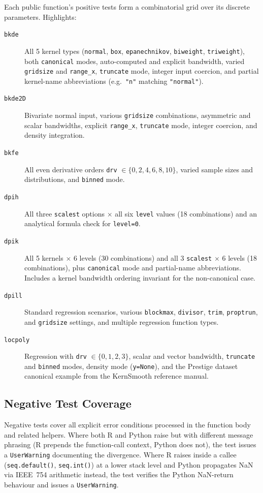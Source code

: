 \documentclass[12pt,a4paper]{article}
\begin{document}
Each public function's positive tests form a combinatorial grid over its discrete parameters. Highlights:
\begin{description}
\item[\texttt{bkde}] All 5 kernel types (\texttt{normal}, \texttt{box}, \texttt{epanechnikov}, \texttt{biweight}, \texttt{triweight}), both \texttt{canonical} modes, auto-computed and explicit bandwidth, varied \texttt{gridsize} and \texttt{range\_x}, \texttt{truncate} mode, integer input coercion, and partial kernel-name abbreviations (e.g.\ \texttt{"n"} matching \texttt{"normal"}).
\item[\texttt{bkde2D}] Bivariate normal input, various \texttt{gridsize} combinations, asymmetric and scalar bandwidths, explicit \texttt{range\_x}, \texttt{truncate} mode, integer coercion, and density integration.
\item[\texttt{bkfe}] All even derivative orders \texttt{drv} $\in \{0, 2, 4, 6, 8, 10\}$, varied sample sizes and distributions, and \texttt{binned} mode.
\item[\texttt{dpih}] All three \texttt{scalest} options $\times$ all six \texttt{level} values (18 combinations) and an analytical formula check for \texttt{level=0}.
\item[\texttt{dpik}] All 5 kernels $\times$ 6 levels (30 combinations) and all 3 \texttt{scalest} $\times$ 6 levels (18 combinations), plus \texttt{canonical} mode and partial-name abbreviations. Includes a kernel bandwidth ordering invariant for the non-canonical case.
\item[\texttt{dpill}] Standard regression scenarios, various \texttt{blockmax}, \texttt{divisor}, \texttt{trim}, \texttt{proptrun}, and \texttt{gridsize} settings, and multiple regression function types.
\item[\texttt{locpoly}] Regression with \texttt{drv} $\in \{0, 1, 2, 3\}$, scalar and vector bandwidth, \texttt{truncate} and \texttt{binned} modes, density mode (\texttt{y=None}), and the Prestige dataset canonical example from the KernSmooth reference manual.
\end{description}

\subsection{Negative Test Coverage}

Negative tests cover all explicit error conditions processed in the function body and related helpers. Where both R and Python raise but with different message phrasing (R prepends the function-call context, Python does not), the test issues a \texttt{UserWarning} documenting the divergence. Where R raises inside a callee (\texttt{seq.default()}, \texttt{seq.int()}) at a lower stack level and Python propagates NaN via IEEE~754 arithmetic instead, the test verifies the Python NaN-return behaviour and issues a \texttt{UserWarning}.
\end{document}
